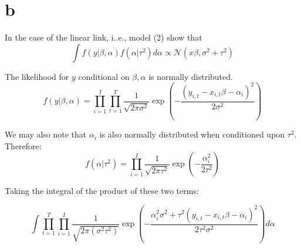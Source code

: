 \documentclass[12pt]{paper}
\newcommand{\abs}[1]{\left \lvert #1 \right \rvert}
\newcommand{\inv}[1]{{#1}^{-1}}
\newcommand{\normal}{\mathcal{N}}
\begin{document}








\section{b}

In the case of the linear link, i..e., model (2) show that
\begin{equation*}
  \int f(y\vert \beta,\alpha)f(\alpha \vert \tau^2)d\alpha \propto \normal(x\beta, \sigma^2 + \tau^2)
\end{equation*}

\vspace{.3in}

The likelihood for $y$ conditional on $\beta,\alpha$ is normally distributed.
\begin{equation*}
  f(y \vert \beta,\alpha) = \prod_{i=1}^I \prod_{t=1}^T \frac{1}{\sqrt{2 \pi \sigma^2}} \exp(
  - \frac{(y_{i,t} - x_{i,t}\beta - \alpha_i)^2}{2 \sigma^2})
\end{equation*}

We may also note that $\alpha_i$ is also normally distributed when
conditioned upon $\tau^2$. Therefore:
\begin{equation*}
  f( \alpha \vert \tau^2) = \prod_{i=1}^I \frac{1}{\sqrt{ 2 \pi \tau^2}} \exp( -
  \frac{\alpha_i^2}{ 2 \tau^2})
\end{equation*}

Taking the integral of the product of these two terms:

\begin{equation*}
  \int \prod_{t=1}^T \prod_{i=1}^I \frac{1}{\sqrt{2 \pi (\sigma^2 \tau^2)}} \exp( -
  \frac{\alpha_i^2 \sigma^2 + \tau^2( y_{i,t} - x_{i,t}\beta - \alpha_i)^2}{2 \tau^2 \sigma^2}) d\alpha
\end{equation*}
\end{document}
